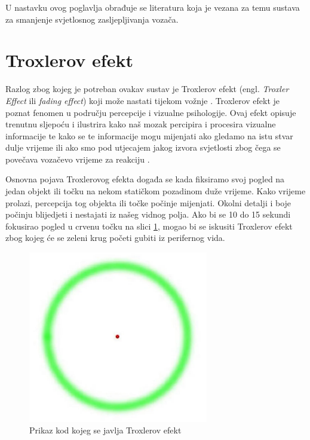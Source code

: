 \documentclass{foi}
\begin{document}
U nastavku ovog poglavlja obrađuje se literatura koja je vezana za temu sustava za smanjenje svjetlosnog zasljepljivanja vozača.

\section{Troxlerov efekt}

Razlog zbog kojeg je potreban ovakav sustav je Troxlerov efekt (engl. \emph{Troxler Effect} ili \emph{fading effect}) koji može nastati tijekom vožnje \cite{Autoevolution2022}. Troxlerov efekt je poznat fenomen u području percepcije i vizualne psihologije. Ovaj efekt opisuje trenutnu sljepoću i ilustrira kako naš mozak percipira i procesira vizualne informacije te kako se te informacije mogu mijenjati ako gledamo na istu stvar dulje vrijeme ili ako smo pod utjecajem jakog izvora svjetlosti zbog čega se povečava vozačevo vrijeme za reakciju \cite[str. 208]{P2014}.

Osnovna pojava Troxlerovog efekta događa se kada fiksiramo svoj pogled na jedan objekt ili točku na nekom statičkom pozadinom duže vrijeme. Kako vrijeme prolazi, percepcija tog objekta ili točke počinje mijenjati. Okolni detalji i boje počinju blijedjeti i nestajati iz našeg vidnog polja. Ako bi se 10 do 15 sekundi fokusirao pogled u crvenu točku na slici \ref{fig:troxlerov_efekt}, mogao bi se iskusiti Troxlerov efekt zbog kojeg će se zeleni krug početi gubiti iz perifernog vida. \cite[str. 664]{Kanai2003}

\begin{figure}[h!]
    \centering
    \includegraphics[width=0.7\textwidth]{slike/troxler_effect}
    \caption{Prikaz kod kojeg se javlja Troxlerov efekt \cite{Autoevolution2022}}
    \label{fig:troxlerov_efekt}
\end{figure}
\end{document}
